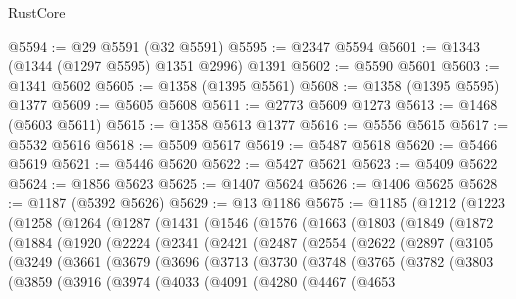 \begin{lexlean}{RustCore}
\begin{coremodule}
@5594 := @29 @5591 (@32 @5591)
@5595 := @2347 @5594
@5601 := @1343 (@1344 (@1297 @5595) @1351 @2996) @1391
@5602 := @5590 @5601
@5603 := @1341 @5602
@5605 := @1358 (@1395 @5561)
@5608 := @1358 (@1395 @5595) @1377
@5609 := @5605 @5608
@5611 := @2773 @5609 @1273
@5613 := @1468 (@5603 @5611)
@5615 := @1358 @5613 @1377
@5616 := @5556 @5615
@5617 := @5532 @5616
@5618 := @5509 @5617
@5619 := @5487 @5618
@5620 := @5466 @5619
@5621 := @5446 @5620
@5622 := @5427 @5621
@5623 := @5409 @5622
@5624 := @1856 @5623
@5625 := @1407 @5624
@5626 := @1406 @5625
@5628 := @1187 (@5392 @5626)
@5629 := @13 @1186
@5675 := @1185
    (@1212
      (@1223
        (@1258
          (@1264
            (@1287
              (@1431
                (@1546
                  (@1576
                    (@1663
                      (@1803
                        (@1849
                          (@1872
                            (@1884
                              (@1920
                                (@2224
                                  (@2341
                                    (@2421
                                      (@2487
                                        (@2554
                                          (@2622
                                            (@2897
                                              (@3105
                                                (@3249
                                                  (@3661
                                                    (@3679
                                                      (@3696
                                                        (@3713
                                                          (@3730
                                                            (@3748
                                                              (@3765
                                                                (@3782
                                                                  (@3803
                                                                    (@3859
                                                                      (@3916
                                                                        (@3974
                                                                          (@4033
                                                                            (@4091
                                                                              (@4280
                                                                                (@4467
                                                                                  (@4653

\end{coremodule}
\end{lexlean}
